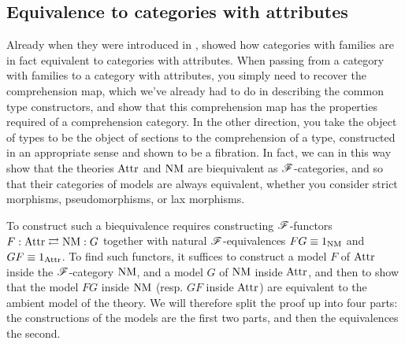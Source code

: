 \documentclass[../thesis.tex]{subfiles}
\begin{document}
\subsection{Equivalence to categories with attributes}\label{sec:nm/equiv attr}
Already when they were introduced in \cite{dybjer1996}, \citeauthor{dybjer1996} showed how categories with families are in
fact equivalent to categories with attributes. When passing from a category with families to a category with attributes,
you simply need to recover the comprehension map, which we've already had to do in describing the common type constructors,
and show that this comprehension map has the properties required of a comprehension category. In the other direction,
you take the object of types to be the object of sections to the comprehension of a type, constructed in an appropriate
sense and shown to be a fibration. In fact, we can in this way show that the theories ${\mathrm{Attr}}$ and ${\mathrm{NM}}$ are biequivalent
as ${\mathscr{F}}$-categories, and so that their categories of models are always equivalent, whether you consider strict morphisms,
pseudomorphisms, or lax morphisms.

To construct such a biequivalence requires constructing ${\mathscr{F}}$-functors $F : {\mathrm{Attr}} \rightleftarrows {\mathrm{NM}} : G$ together with
natural ${\mathscr{F}}$-equivalences $FG \equiv 1_{\mathrm{NM}}$ and $GF \equiv 1_{\mathrm{Attr}}$. To find such functors, it suffices to construct a model
$F$ of ${\mathrm{Attr}}$ inside the ${\mathscr{F}}$-category ${\mathrm{NM}}$, and a model $G$ of ${\mathrm{NM}}$ inside ${\mathrm{Attr}}$, and then to show that the model $FG$
inside ${\mathrm{NM}}$ (resp. $GF$ inside ${\mathrm{Attr}}$) are equivalent to the ambient model of the theory. We will therefore split the proof
up into four parts: the constructions of the models are the first two parts, and then the equivalences the second.
\end{document}
